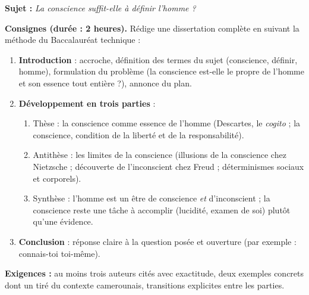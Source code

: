 \documentclass[11pt]{article}
\newcounter{popsec}
\newcounter{popsub}
\newcommand{\courssub}[1]{%
  \stepcounter{popsub}%
  \par\vspace{9pt}\noindent{\popxbold\fontsize{11.5}{13}\selectfont\color{popink}{\color{poporange}\thepopsec.\thepopsub}\hspace{6pt}#1}\par\nopagebreak\vspace{4pt}
}
\begin{document}
\courssub{Je me prépare au Bac}

\begin{exercice}
\textbf{Sujet :} \emph{La conscience suffit-elle à définir l'homme ?}

\textbf{Consignes (durée : 2 heures).} Rédige une dissertation complète en suivant la méthode du Baccalauréat technique :
\begin{enumerate}
\item \textbf{Introduction} : accroche, définition des termes du sujet (conscience, définir, homme), formulation du problème (la conscience est-elle le propre de l'homme et son essence tout entière ?), annonce du plan.
\item \textbf{Développement en trois parties} :
\begin{enumerate}
\item[(a)] Thèse : la conscience comme essence de l'homme (Descartes, le \emph{cogito} ; la conscience, condition de la liberté et de la responsabilité).
\item[(b)] Antithèse : les limites de la conscience (illusions de la conscience chez Nietzsche ; découverte de l'inconscient chez Freud ; déterminismes sociaux et corporels).
\item[(c)] Synthèse : l'homme est un être de conscience \emph{et} d'inconscient ; la conscience reste une tâche à accomplir (lucidité, examen de soi) plutôt qu'une évidence.
\end{enumerate}
\item \textbf{Conclusion} : réponse claire à la question posée et ouverture (par exemple : connais-toi toi-même).
\end{enumerate}
\textbf{Exigences :} au moins trois auteurs cités avec exactitude, deux exemples concrets dont un tiré du contexte camerounais, transitions explicites entre les parties.
\end{exercice}
\end{document}
